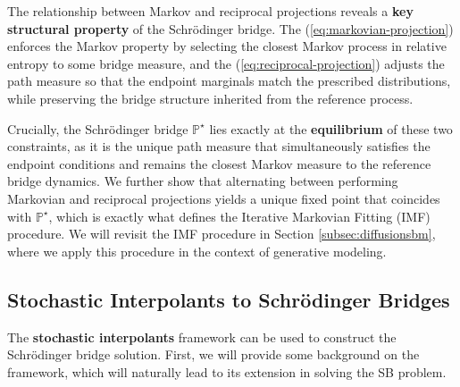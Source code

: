 \documentclass{article}
\newcommand{\boldtext}[1]{\textbf{\textcolor{MyGreen}{#1}}}
\begin{document}
The relationship between Markov and reciprocal projections reveals a \textbf{key structural property} of the Schrödinger bridge. The (\ref{eq:markovian-projection}) enforces the Markov property by selecting the closest Markov process in relative entropy to some bridge measure, and the (\ref{eq:reciprocal-projection}) adjusts the path measure so that the endpoint marginals match the prescribed distributions, while preserving the bridge structure inherited from the reference process. 

Crucially, the Schrödinger bridge $\mathbb{P}^\star$ lies exactly at the \textbf{equilibrium} of these two constraints, as it is the unique path measure that simultaneously satisfies the endpoint conditions and remains the closest Markov measure to the reference bridge dynamics. We further show that alternating between performing Markovian and reciprocal projections yields a unique fixed point that coincides with $\mathbb{P}^\star$, which is exactly what defines the Iterative Markovian Fitting (IMF) procedure. We will revisit the IMF procedure in Section \ref{subsec:diffusionsbm}, where we apply this procedure in the context of generative modeling. 

\subsection{Stochastic Interpolants to Schrödinger Bridges}
\label{subsec:stochastic-interpolants}

The \boldtext{stochastic interpolants} framework \citep{albergo2025stochastic} can be used to construct the Schrödinger bridge solution. First, we will provide some background on the framework, which will naturally lead to its extension in solving the SB problem. 
\end{document}
